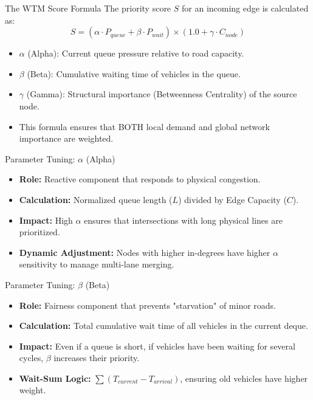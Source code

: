 \documentclass{beamer}
\begin{document}
\begin{frame}{The WTM Score Formula}
    The priority score $S$ for an incoming edge is calculated as:
    \begin{equation*}
        S = (\alpha \cdot P_{queue} + \beta \cdot P_{wait}) \times (1.0 + \gamma \cdot C_{node})
    \end{equation*} \pause
    \begin{itemize}
        \item $\alpha$ (Alpha): Current queue pressure relative to road capacity. \pause
        \item $\beta$ (Beta): Cumulative waiting time of vehicles in the queue. \pause
        \item $\gamma$ (Gamma): Structural importance (Betweenness Centrality) of the source node. \pause
        \item This formula ensures that BOTH local demand and global network importance are weighted.
    \end{itemize}
\end{frame}

\begin{frame}{Parameter Tuning: $\alpha$ (Alpha)}
    \begin{itemize}
        \item \textbf{Role:} Reactive component that responds to physical congestion. \pause
        \item \textbf{Calculation:} Normalized queue length ($L$) divided by Edge Capacity ($C$). \pause
        \item \textbf{Impact:} High $\alpha$ ensures that intersections with long physical lines are prioritized. \pause
        \item \textbf{Dynamic Adjustment:} Nodes with higher in-degrees have higher $\alpha$ sensitivity to manage multi-lane merging.
    \end{itemize}
\end{frame}

\begin{frame}{Parameter Tuning: $\beta$ (Beta)}
    \begin{itemize}
        \item \textbf{Role:} Fairness component that prevents "starvation" of minor roads. \pause
        \item \textbf{Calculation:} Total cumulative wait time of all vehicles in the current deque. \pause
        \item \textbf{Impact:} Even if a queue is short, if vehicles have been waiting for several cycles, $\beta$ increases their priority. \pause
        \item \textbf{Wait-Sum Logic:} $\sum (T_{current} - T_{arrival})$, ensuring old vehicles have higher weight.
    \end{itemize}
\end{frame}
\end{document}
